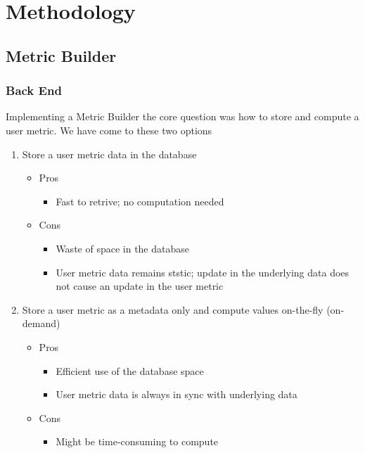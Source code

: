 \chapter{Methodology}

\section{Metric Builder}

	\subsection{Back End}

		Implementing a Metric Builder the core question was how to store and compute a user metric. We have come to these two options

		\begin{enumerate}
			\item
				Store a user metric data in the database
				\begin{itemize}
					\item
						Pros
						\begin{itemize}
							\item
								Fast to retrive; no computation needed
						\end{itemize}
					\item
						Cons
						\begin{itemize}
							\item
								Waste of space in the database
							\item
								User metric data remains ststic; update in the underlying data does not cause an update in the user metric
						\end{itemize}
				\end{itemize}
			\item
				Store a user metric as a metadata only and compute values on-the-fly (on-demand)
				\begin{itemize}
					\item
						Pros
						\begin{itemize}
							\item
								Efficient use of the database space
							\item
								User metric data is always in sync with underlying data
						\end{itemize}
					\item
						Cons
						\begin{itemize}
							\item
								Might be time-consuming to compute
						\end{itemize}
				\end{itemize}
		\end{enumerate}

